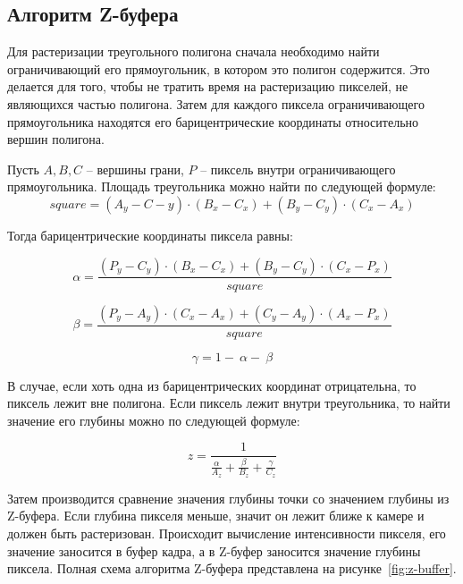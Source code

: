 \clearpage

\subsection{Алгоритм Z-буфера}

Для растеризации треугольного полигона сначала необходимо найти ограничивающий его прямоугольник, в котором это полигон содержится. 
Это делается для того, чтобы не тратить время на растеризацию пикселей, не являющихся частью полигона.
Затем для каждого пиксела ограничивающего прямоугольника находятся его барицентрические координаты относительно вершин полигона.

Пусть $A, B, C$ – вершины грани, $P$ – пиксель внутри ограничивающего прямоугольника.
Площадь треугольника можно найти по следующей формуле:
\begin{equation}
	square = (A_y - C-y) \cdot (B_x - C_x) + (B_y - C_y) \cdot (C_x - A_x)
\end{equation}

Тогда барицентрические координаты пиксела равны:

\begin{equation}
	\alpha=\frac{\left(P_y-C_y\right)\cdot\left(B_x-C_x\right)+\left(B_y-C_y\right)\cdot\left(C_x-P_x\right)}{square}
\end{equation}	

\begin{equation}
	\beta=\frac{\left(P_y-A_y\right)\cdot\left(C_x-A_x\right)+\left(C_y-A_y\right)\cdot\left(A_x-P_x\right)}{square}
\end{equation}

\begin{equation}
	\gamma=1-\ \alpha-\ \beta
\end{equation}

В случае, если хоть одна из барицентрических координат отрицательна, то пиксель лежит вне полигона. Если пиксель лежит внутри треугольника, то найти значение его глубины можно по следующей формуле:

\begin{equation}
	z=\frac{1}{\frac{\alpha}{A_z}+\frac{\beta}{B_z}+\frac{\gamma}{C_z}}
\end{equation}

Затем производится сравнение значения глубины точки со значением глубины из Z-буфера. Если глубина пикселя меньше, значит он лежит ближе к камере и должен быть растеризован. Происходит вычисление интенсивности пикселя, его значение заносится в буфер кадра, а в Z-буфер заносится значение глубины пиксела. Полная схема алгоритма Z-буфера представлена на 
рисунке~\ref{fig:z-buffer}.

